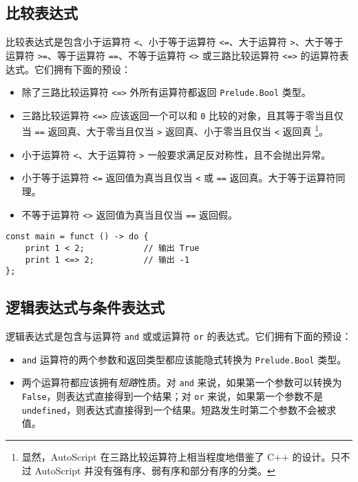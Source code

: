 \subsection{比较表达式}

比较表达式是包含小于运算符 \lstinline!<!、小于等于运算符 \lstinline!<=!、大于运算符 \lstinline!>!、大于等于运算符 \lstinline!>=!、等于运算符 \lstinline!==!、不等于运算符 \lstinline!<>! 或三路比较运算符 \lstinline!<=>! 的运算符表达式。它们拥有下面的预设：

\begin{itemize}
    \item 除了三路比较运算符 \lstinline!<=>! 外所有运算符都返回 \lstinline!Prelude.Bool! 类型。

    \item 三路比较运算符 \lstinline!<=>! 应该返回一个可以和 \lstinline!0! 比较的对象，且其等于零当且仅当 \lstinline!==! 返回真、大于零当且仅当 \lstinline!>! 返回真、小于零当且仅当 \lstinline!<! 返回真 \footnote{显然，AutoScript 在三路比较运算符上相当程度地借鉴了 C++ 的设计。只不过 AutoScript 并没有强有序、弱有序和部分有序的分类。}。
    
    \item 小于运算符 \lstinline!<!、大于运算符 \lstinline!>! 一般要求满足反对称性，且不会抛出异常。

    \item 小于等于运算符 \lstinline!<=! 返回值为真当且仅当 \lstinline!<! 或 \lstinline!==! 返回真。大于等于运算符同理。

    \item 不等于运算符 \lstinline!<>! 返回值为真当且仅当 \lstinline!==! 返回假。
\end{itemize}

\begin{lstlisting}
const main = funct () -> do {
    print 1 < 2;            // 输出 True
    print 1 <=> 2;          // 输出 -1
};
\end{lstlisting}

\subsection{逻辑表达式与条件表达式}

逻辑表达式是包含与运算符 \lstinline!and! 或或运算符 \lstinline!or! 的表达式。它们拥有下面的预设：

\begin{itemize}
	\item \lstinline!and! 运算符的两个参数和返回类型都应该能隐式转换为 \lstinline!Prelude.Bool! 类型。

    \item 两个运算符都应该拥有\emph{短路}性质。对 \lstinline!and! 来说，如果第一个参数可以转换为 \lstinline!False!，则表达式直接得到一个结果；对 \lstinline!or! 来说，如果第一个参数不是 \lstinline!undefined!，则表达式直接得到一个结果。短路发生时第二个参数不会被求值。
\end{itemize}

